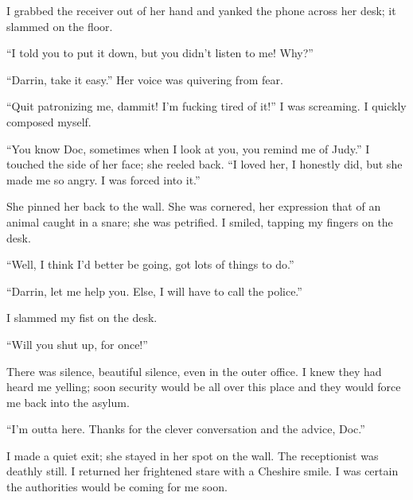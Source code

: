 \documentclass[
]{article}
\begin{document}
I grabbed the receiver out of her hand and yanked the phone across her
desk; it slammed on the floor.

``I told you to put it down, but you didn't listen to me! Why?''

``Darrin, take it easy.'' Her voice was quivering from fear.

``Quit patronizing me, dammit! I'm fucking tired of it!'' I was
screaming. I quickly composed myself.

``You know Doc, sometimes when I look at you, you remind me of Judy.'' I
touched the side of her face; she reeled back. ``I loved her, I honestly
did, but she made me so angry. I was forced into it.''

She pinned her back to the wall. She was cornered, her expression that
of an animal caught in a snare; she was petrified. I smiled, tapping my
fingers on the desk.

``Well, I think I'd better be going, got lots of things to do.''

``Darrin, let me help you. Else, I will have to call the police.''

I slammed my fist on the desk.

``Will you shut up, for once!''

There was silence, beautiful silence, even in the outer office. I knew
they had heard me yelling; soon security would be all over this place
and they would force me back into the asylum.

``I'm outta here. Thanks for the clever conversation and the advice,
Doc.''

I made a quiet exit; she stayed in her spot on the wall. The
receptionist was deathly still. I returned her frightened stare with a
Cheshire smile. I was certain the authorities would be coming for me
soon.
\end{document}
